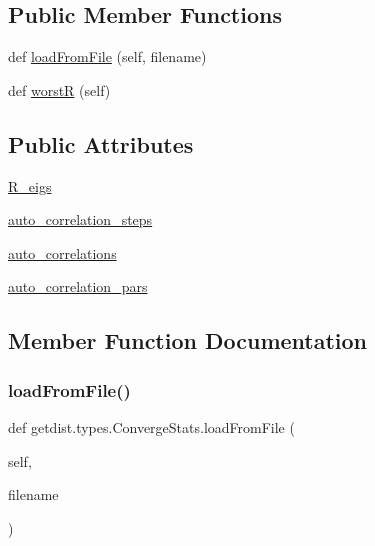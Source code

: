 \subsection*{Public Member Functions}
\begin{DoxyCompactItemize}
\item 
def \mbox{\hyperlink{classgetdist_1_1types_1_1ConvergeStats_a39461ee261a8868271b6e6c021ec6520}{load\+From\+File}} (self, filename)
\item 
def \mbox{\hyperlink{classgetdist_1_1types_1_1ConvergeStats_a4d318e5ca56a7d7be65606f48f289cc1}{worstR}} (self)
\end{DoxyCompactItemize}
\subsection*{Public Attributes}
\begin{DoxyCompactItemize}
\item 
\mbox{\hyperlink{classgetdist_1_1types_1_1ConvergeStats_a97ed08abd3f4f3ae367b28420d082ee8}{R\+\_\+eigs}}
\item 
\mbox{\hyperlink{classgetdist_1_1types_1_1ConvergeStats_ab6f13d2e982e01e8574304a9c2938185}{auto\+\_\+correlation\+\_\+steps}}
\item 
\mbox{\hyperlink{classgetdist_1_1types_1_1ConvergeStats_a9b70f13bb6c8adcb942dfb2211eb4ff9}{auto\+\_\+correlations}}
\item 
\mbox{\hyperlink{classgetdist_1_1types_1_1ConvergeStats_a14ff2968ab9fd263bb71265c6239f225}{auto\+\_\+correlation\+\_\+pars}}
\end{DoxyCompactItemize}


\subsection{Member Function Documentation}
\mbox{\label{classgetdist_1_1types_1_1ConvergeStats_a39461ee261a8868271b6e6c021ec6520}} 
\subsubsection{\texorpdfstring{load\+From\+File()}{loadFromFile()}}
{\footnotesize\ttfamily def getdist.\+types.\+Converge\+Stats.\+load\+From\+File (\begin{DoxyParamCaption}\item[{}]{self,  }\item[{}]{filename }\end{DoxyParamCaption})}



